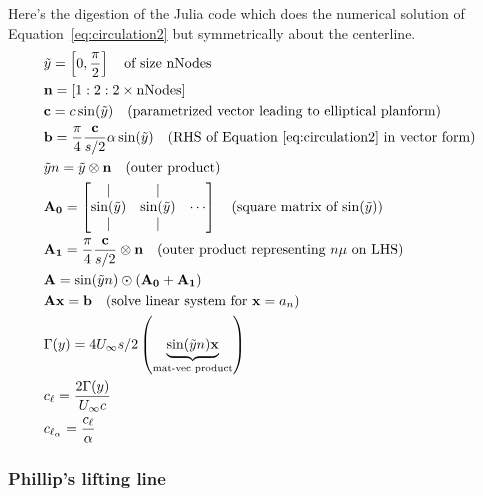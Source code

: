 \documentclass[10pt]{article}
\newcommand{\mbf}[1]{\mathbf{#1}}
\newcommand{\Uinf}{U_{\infty}}
\newcommand{\tn}[1]{\textnormal{#1}}
\begin{document}
Here's the digestion of the Julia code which does the numerical solution of Equation~\eqref{eq:circulation2} but symmetrically about the centerline.
\begin{align*}
     & \tilde{y} = \left[
        0,\frac{\pi}{2}
        \right] \quad \tn{of size nNodes}
    \\
     & \mbf{n} = \left[1:2:2\times\tn{nNodes}\right]
    \\
     & \mbf{c} = c  \sin(\tilde{y}) \quad \tn{(parametrized vector leading to elliptical planform)}
    \\
     & \mbf{b} = \frac{\pi}{4} \frac{\mbf{c}}{s/2} \alpha \sin(\tilde{y}) \quad \tn{(RHS of Equation~\eqref{eq:circulation2} in vector form)}
    \\
     & \tilde{y}n = \tilde{y} \otimes \mbf{n} \quad \tn{(outer product)}
    \\
     & \mbf{A_0} = \begin{bmatrix}
                       |               & |                        \\
                       \sin(\tilde{y}) & \sin(\tilde{y}) & \cdots \\
                       |               & |
                   \end{bmatrix} \quad \tn{(square matrix of $\sin(\tilde{y})$)}
    \\
     & \mbf{A_1} = \frac{\pi}{4} \frac{\mbf{c}}{s/2} \otimes \mbf{n} \quad \tn{(outer product representing $n\mu$ on LHS)}
    \\
     & \mbf{A} = \sin(\tilde{y} n ) \odot \left( \mbf{A_0}+\mbf{A_1} \right)                                                                  \\
     & \mbf{A}\mbf{x} = \mbf{b} \quad \tn{(solve linear system for $\mbf{x} = a_n$)}                                                          \\
     & \Gamma(y) = 4 \Uinf s/2 \left(\underbrace{\sin(\tilde{y}n)\mbf{x} }_{\tn{mat-vec product}} \right)                                     \\
     & c_\ell = \frac{2\Gamma(y)}{\Uinf {c}}                                                                                                  \\
     & c_{\ell_{\alpha}} = \frac{c_\ell}{\alpha}
\end{align*}

\subsubsection{Phillip's lifting line}
\end{document}
